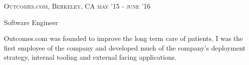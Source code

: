 
\textsc{\small{Outcomes.com, Berkeley, CA}}
\hfill	
\textsc{\raggedleft may '15 - june '16}
  
{\Large Software Engineer}

Outcomes.com was founded to improve the long term care of patients. I was the first employee of the company and developed much of the company's deployment strategy, internal tooling and external facing applications. 
